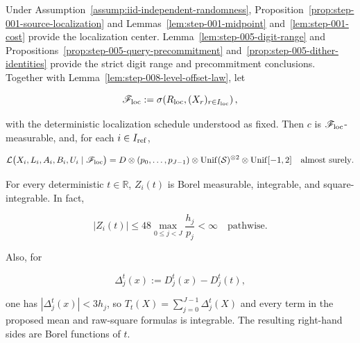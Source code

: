 \begin{lemma}\label{lem:step-008-refinement-kernel}
Under Assumption~\ref{assump:iid-independent-randomness},
Proposition~\ref{prop:step-001-source-localization} and
Lemmas~\ref{lem:step-001-midpoint} and~\ref{lem:step-001-cost} provide the
localization center. Lemma~\ref{lem:step-005-digit-range} and
Propositions~\ref{prop:step-005-query-precommitment}
and~\ref{prop:step-005-dither-identities} provide the strict digit range and
precommitment conclusions. Together with
Lemma~\ref{lem:step-008-level-offset-law}, let

\[
\mathscr F_{\rm loc}
:=\sigma\!\left(R_{\rm loc},(X_r)_{r\in I_{\rm loc}}\right),
\]

with the deterministic localization schedule understood as fixed. Then \(c\) is \(\mathscr F_{\rm loc}\)-measurable, and, for each \(i\in I_{\rm ref}\),

\[
\mathcal L\bigl(X_i,L_i,A_i,B_i,U_i\mid\mathscr F_{\rm loc}\bigr)
=D\otimes(p_0,\ldots,p_{J-1})
 \otimes {\rm Unif}(\mathcal S)^{\otimes2}
 \otimes {\rm Unif}[-1,2]
\quad\text{almost surely}.
\]

For every deterministic \(t\in\mathbb R\), \(Z_i(t)\) is Borel measurable, integrable, and square-integrable. In fact,

\[
|Z_i(t)|
\leq48\max_{0\leq j<J}\frac{h_j}{p_j}<\infty
\quad\text{pathwise}.
\]

Also, for

\[
\Delta_j^t(x):=D_j^t(x)-D_j^t(t),
\]

one has \(|\Delta_j^t(x)|<3h_j\), so \(T_t(X)=\sum_{j=0}^{J-1}\Delta_j^t(X)\) and every term in the proposed mean and raw-square formulas is integrable. The resulting right-hand sides are Borel functions of \(t\).
\end{lemma}

